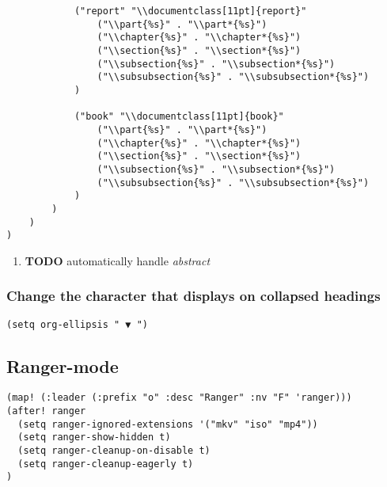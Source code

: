 \documentclass[11pt]{article}
\begin{document}
\begin{verbatim}
            ("report" "\\documentclass[11pt]{report}"
                ("\\part{%s}" . "\\part*{%s}")
                ("\\chapter{%s}" . "\\chapter*{%s}")
                ("\\section{%s}" . "\\section*{%s}")
                ("\\subsection{%s}" . "\\subsection*{%s}")
                ("\\subsubsection{%s}" . "\\subsubsection*{%s}")
            )

            ("book" "\\documentclass[11pt]{book}"
                ("\\part{%s}" . "\\part*{%s}")
                ("\\chapter{%s}" . "\\chapter*{%s}")
                ("\\section{%s}" . "\\section*{%s}")
                ("\\subsection{%s}" . "\\subsection*{%s}")
                ("\\subsubsection{%s}" . "\\subsubsection*{%s}")
            )
        )
    )
)
\end{verbatim}
\begin{enumerate}
\item {\bfseries\sffamily TODO} automatically handle \emph{abstract}
\label{sec:org5bb2b6e}
\end{enumerate}
\subsubsection{Change the character that displays on collapsed headings}
\label{sec:org8224c15}
\begin{verbatim}
(setq org-ellipsis " ▼ ")
\end{verbatim}
\subsection{Ranger-mode}
\label{sec:org0b27a89}
\begin{verbatim}
(map! (:leader (:prefix "o" :desc "Ranger" :nv "F" 'ranger)))
(after! ranger
  (setq ranger-ignored-extensions '("mkv" "iso" "mp4"))
  (setq ranger-show-hidden t)
  (setq ranger-cleanup-on-disable t)
  (setq ranger-cleanup-eagerly t)
)

\end{verbatim}
\end{document}
